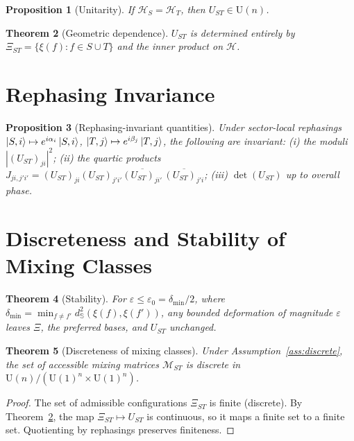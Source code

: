 ﻿\documentclass[12pt]{article}
\newtheorem{theorem}{Theorem}[section]
\newtheorem{proposition}[theorem]{Proposition}
\theoremstyle{definition}
\theoremstyle{remark}
\newcommand{\Sphere}{\mathbb{S}^2}
\newcommand{\U}{\mathrm{U}}
\newcommand{\calH}{\mathcal{H}}
\newcommand{\calHS}{\mathcal{H}_S}
\newcommand{\calHT}{\mathcal{H}_T}
\begin{document}
\begin{proposition}[Unitarity]\label{prop:unitary}
If $\calHS=\calHT$, then $U_{ST}\in\U(n)$.
\end{proposition}

\begin{theorem}[Geometric dependence]\label{thm:geom}
$U_{ST}$ is determined entirely by $\Xi_{ST}=\{\xi(f):f\in S\cup T\}$
and the inner product on $\calH$.
\end{theorem}

\section{Rephasing Invariance}

\begin{proposition}[Rephasing-invariant quantities]\label{prop:rephinv}
Under sector-local rephasings $\ket{S,i}\mapsto e^{i\alpha_i}\ket{S,i}$,
$\ket{T,j}\mapsto e^{i\beta_j}\ket{T,j}$, the following are invariant:
\emph{(i)} the moduli $|(U_{ST})_{ji}|^2$;
\emph{(ii)} the quartic products
$J_{ji,j'i'}=(U_{ST})_{ji}(U_{ST})_{j'i'}\overline{(U_{ST})_{ji'}}\,\overline{(U_{ST})_{j'i}}$;
\emph{(iii)} $\det(U_{ST})$ up to overall phase.
\end{proposition}

\section{Discreteness and Stability of Mixing Classes}

\begin{theorem}[Stability]\label{thm:stability}
For $\varepsilon\leq\varepsilon_0=\delta_{\min}/2$, where
$\delta_{\min}=\min_{f\neq f'}d_\Sphere(\xi(f),\xi(f'))$, any bounded
deformation of magnitude $\varepsilon$ leaves $\Xi$, the preferred bases,
and $U_{ST}$ unchanged.
\end{theorem}

\begin{theorem}[Discreteness of mixing classes]\label{thm:discrete-classes}
Under Assumption~\ref{ass:discrete}, the set of accessible mixing matrices
$\mathcal{M}_{ST}$ is discrete in $\U(n)/(\U(1)^n\times\U(1)^n)$.
\end{theorem}

\begin{proof}
The set of admissible configurations $\Xi_{ST}$ is finite (discrete).
By Theorem~\ref{thm:geom}, the map $\Xi_{ST}\mapsto U_{ST}$ is continuous,
so it maps a finite set to a finite set. Quotienting by rephasings
preserves finiteness.
\end{proof}
\end{document}
